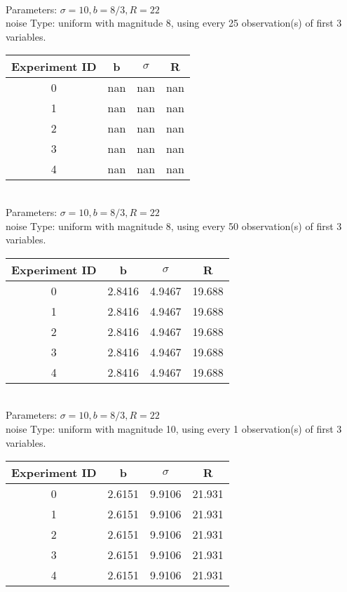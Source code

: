 \begin{multicols}{3}
\begin{tabular}{cccc}
 \end{tabular}\\
Parameters: $\sigma=10, b=8/3, R=22$\\
noise Type: uniform with magnitude 8, using every 25 observation(s) of first 3 variables.\\
\begin{tabular}{cccc}
\hline Experiment ID & b & $\sigma$ & R \\ \hline 
0 & nan & nan & nan\\ \hline 
 1 & nan & nan & nan\\ \hline 
 2 & nan & nan & nan\\ \hline 
 3 & nan & nan & nan\\ \hline 
 4 & nan & nan & nan\\ \hline 
 \end{tabular}\\
Parameters: $\sigma=10, b=8/3, R=22$\\
noise Type: uniform with magnitude 8, using every 50 observation(s) of first 3 variables.\\
\begin{tabular}{cccc}
\hline Experiment ID & b & $\sigma$ & R \\ \hline 
0 & 2.8416 & 4.9467 & 19.688\\ \hline 
 1 & 2.8416 & 4.9467 & 19.688\\ \hline 
 2 & 2.8416 & 4.9467 & 19.688\\ \hline 
 3 & 2.8416 & 4.9467 & 19.688\\ \hline 
 4 & 2.8416 & 4.9467 & 19.688\\ \hline 
 \end{tabular}\\
Parameters: $\sigma=10, b=8/3, R=22$\\
noise Type: uniform with magnitude 10, using every 1 observation(s) of first 3 variables.\\
\begin{tabular}{cccc}
\hline Experiment ID & b & $\sigma$ & R \\ \hline 
0 & 2.6151 & 9.9106 & 21.931\\ \hline 
 1 & 2.6151 & 9.9106 & 21.931\\ \hline 
 2 & 2.6151 & 9.9106 & 21.931\\ \hline 
 3 & 2.6151 & 9.9106 & 21.931\\ \hline 
 4 & 2.6151 & 9.9106 & 21.931\\ \hline 
 \end{tabular}\\

\end{multicols}
